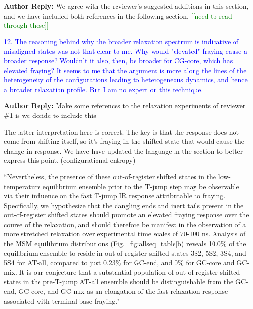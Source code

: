 \documentclass[11pt,a4paper]{letter} %
\newcommand*{\noteg}[1]{\textcolor{green}{[[#1]]}}		%
\begin{document}
\textbf{Author Reply:}   We agree with the reviewer's suggested additions in this section, and we have included both references in the following section. \noteg{need to read through these}

\citep{Flamm2000RNAResolution}

\textcolor{blue}{12. The reasoning behind why the broader relaxation spectrum is indicative of misaligned states was not that clear to me. Why would "elevated" fraying cause a broader response? Wouldn't it also, then, be broader for CG-core, which has elevated fraying? It seems to me that the argument is more along the lines of the heterogeneity of the configurations leading to heterogeneous dynamics, and hence a broader relaxation profile. But I am no expert on this technique.}

\textbf{Author Reply:}   Make some references to the relaxation experiments of reviewer \#1 is we decide to include this.


The latter interpretation here is correct. The key is that the response does not come from shifting itself, so it’s fraying in the shifted state that would cause the change in response. We have have updated the language in the section to better express this point. (configurational entropy)

``Nevertheless, the presence of these out-of-register shifted states in the low-temperature equilibrium ensemble prior to the T-jump step may be observable via their influence on the fast T-jump IR response attributable to fraying. Specifically, we hypothesize that the dangling ends and inert tails present in the out-of-register shifted states should promote an elevated fraying response over the course of the relaxation, and should therefore be manifest in the observation of a more stretched relaxation over experimental time scales of 70-100 ns. Analysis of the MSM equilibrium distributions (Fig.~\ref{fig:allseq_table}b) reveals 10.0\% of the equilibrium ensemble to reside in out-of-register shifted states 3S2, 5S2, 3S4, and 5S4 for AT-all, compared to just 0.23\% for GC-end, and 0\% for GC-core and GC-mix. It is our conjecture that a substantial population of out-of-register shifted states in the pre-T-jump AT-all ensemble should be distinguishable from the GC-end, GC-core, and GC-mix as an elongation of the fast relaxation response associated with terminal base fraying.''
\end{document}
